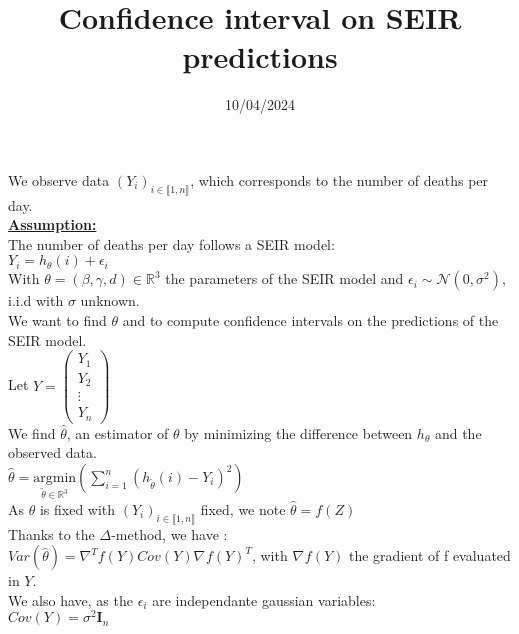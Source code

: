 \documentclass{article}
\title{Confidence interval on SEIR predictions}
\author{}
\date{10/04/2024}
\begin{document}
\maketitle


We observe data $(Y_i)_{i \in \llbracket 1, n  \rrbracket }$, which corresponds to the number of deaths per day. \\[0.5cm]

\underline{\textbf{Assumption:}}\\[0.5cm]
The number of deaths per day follows a SEIR model: \\
$Y_i = h_\theta(i) + \epsilon_i$\\

With $\theta = (\beta , \gamma , d ) \in \mathbb{R} ^3$ the parameters of the SEIR model and $\epsilon_i \sim \mathcal{N}(0, \sigma^2)$, i.i.d with $\sigma$ unknown.\\[0.5cm]

We want to find $\theta$ and to compute confidence intervals on the predictions of the SEIR model. \\[0.5cm]

Let $Y = 
\begin{pmatrix}
    Y_1 \\
    Y_2 \\
    \vdots \\
    Y_n
\end{pmatrix} $ \\[0.2cm]


We find $\hat{\theta}$, an estimator of $\theta$ by minimizing the difference between $h_\theta$ and the observed data.\\

$\hat{\theta}= \underset{\tilde{\theta} \in \mathbb{R} ^3}{\text{argmin}} \left(\sum_{i=1}^{n} (h_{\tilde{\theta}}(i) - Y_i)^2\right) $\\
As $\theta$ is fixed with $(Y_i)_{i \in \llbracket 1 , n  \rrbracket}$ fixed, we note $\hat{\theta} = f(Z)$\\

Thanks to the $\Delta$-method, we have : \\

$Var(\hat{\theta}) = \nabla_{} ^T f(Y) Cov(Y) \nabla_{} f(Y)^T$, with $\nabla_{}f(Y)$ the gradient of f evaluated in $Y$. \\

We also have, as the $\epsilon_i$ are independante gaussian variables: \\[0.2cm]
$Cov(Y) = \sigma ^2 \mathbf{I}_n$\\
\end{document}

